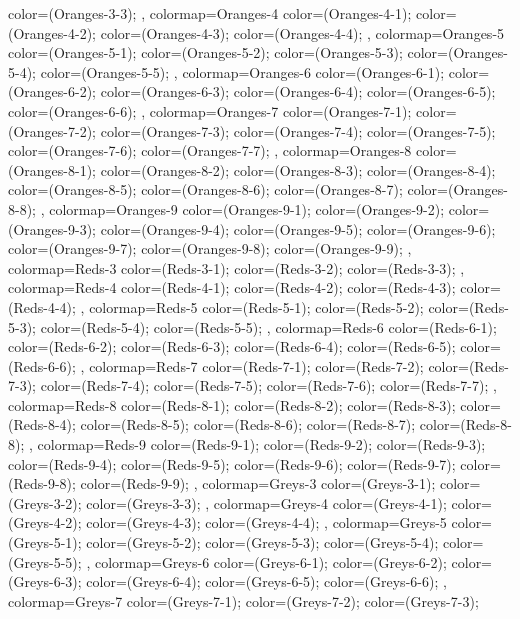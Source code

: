 {{  color=(Oranges-3-3);
},
colormap={Oranges-4}{
  color=(Oranges-4-1);
  color=(Oranges-4-2);
  color=(Oranges-4-3);
  color=(Oranges-4-4);
},
colormap={Oranges-5}{
  color=(Oranges-5-1);
  color=(Oranges-5-2);
  color=(Oranges-5-3);
  color=(Oranges-5-4);
  color=(Oranges-5-5);
},
colormap={Oranges-6}{
  color=(Oranges-6-1);
  color=(Oranges-6-2);
  color=(Oranges-6-3);
  color=(Oranges-6-4);
  color=(Oranges-6-5);
  color=(Oranges-6-6);
},
colormap={Oranges-7}{
  color=(Oranges-7-1);
  color=(Oranges-7-2);
  color=(Oranges-7-3);
  color=(Oranges-7-4);
  color=(Oranges-7-5);
  color=(Oranges-7-6);
  color=(Oranges-7-7);
},
colormap={Oranges-8}{
  color=(Oranges-8-1);
  color=(Oranges-8-2);
  color=(Oranges-8-3);
  color=(Oranges-8-4);
  color=(Oranges-8-5);
  color=(Oranges-8-6);
  color=(Oranges-8-7);
  color=(Oranges-8-8);
},
colormap={Oranges-9}{
  color=(Oranges-9-1);
  color=(Oranges-9-2);
  color=(Oranges-9-3);
  color=(Oranges-9-4);
  color=(Oranges-9-5);
  color=(Oranges-9-6);
  color=(Oranges-9-7);
  color=(Oranges-9-8);
  color=(Oranges-9-9);
},
colormap={Reds-3}{
  color=(Reds-3-1);
  color=(Reds-3-2);
  color=(Reds-3-3);
},
colormap={Reds-4}{
  color=(Reds-4-1);
  color=(Reds-4-2);
  color=(Reds-4-3);
  color=(Reds-4-4);
},
colormap={Reds-5}{
  color=(Reds-5-1);
  color=(Reds-5-2);
  color=(Reds-5-3);
  color=(Reds-5-4);
  color=(Reds-5-5);
},
colormap={Reds-6}{
  color=(Reds-6-1);
  color=(Reds-6-2);
  color=(Reds-6-3);
  color=(Reds-6-4);
  color=(Reds-6-5);
  color=(Reds-6-6);
},
colormap={Reds-7}{
  color=(Reds-7-1);
  color=(Reds-7-2);
  color=(Reds-7-3);
  color=(Reds-7-4);
  color=(Reds-7-5);
  color=(Reds-7-6);
  color=(Reds-7-7);
},
colormap={Reds-8}{
  color=(Reds-8-1);
  color=(Reds-8-2);
  color=(Reds-8-3);
  color=(Reds-8-4);
  color=(Reds-8-5);
  color=(Reds-8-6);
  color=(Reds-8-7);
  color=(Reds-8-8);
},
colormap={Reds-9}{
  color=(Reds-9-1);
  color=(Reds-9-2);
  color=(Reds-9-3);
  color=(Reds-9-4);
  color=(Reds-9-5);
  color=(Reds-9-6);
  color=(Reds-9-7);
  color=(Reds-9-8);
  color=(Reds-9-9);
},
colormap={Greys-3}{
  color=(Greys-3-1);
  color=(Greys-3-2);
  color=(Greys-3-3);
},
colormap={Greys-4}{
  color=(Greys-4-1);
  color=(Greys-4-2);
  color=(Greys-4-3);
  color=(Greys-4-4);
},
colormap={Greys-5}{
  color=(Greys-5-1);
  color=(Greys-5-2);
  color=(Greys-5-3);
  color=(Greys-5-4);
  color=(Greys-5-5);
},
colormap={Greys-6}{
  color=(Greys-6-1);
  color=(Greys-6-2);
  color=(Greys-6-3);
  color=(Greys-6-4);
  color=(Greys-6-5);
  color=(Greys-6-6);
},
colormap={Greys-7}{
  color=(Greys-7-1);
  color=(Greys-7-2);
  color=(Greys-7-3);
}}
